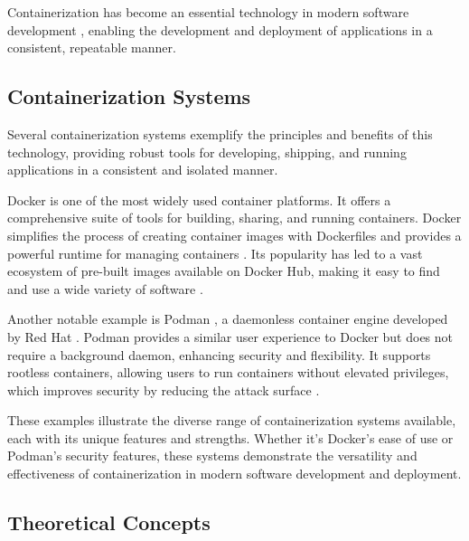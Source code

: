 Containerization has become an essential technology in modern software development
\cite[Docker: a Little Background]{merkelDockerLightweightLinux2014}, enabling the
development and deployment of applications in a consistent, repeatable manner.

\subsection{Containerization Systems}

Several containerization systems exemplify the principles and benefits of this
technology, providing robust tools for developing, shipping, and running applications
in a consistent and isolated manner.

Docker \cite{DockerHomepage2022} is one of the most widely used container platforms.
It offers a comprehensive suite of tools for building, sharing, and running containers.
Docker simplifies the process of creating container images with Dockerfiles and
provides a powerful runtime for managing containers \cite{DockerfileReference0200}.
Its popularity has led to a vast ecosystem of pre-built images available on Docker
Hub, making it easy to find and use a wide variety of software \cite{DockerHubContainer}.

Another notable example is Podman \cite{Podman2024}, a daemonless container engine
developed by Red Hat \cite{RedHatWe}. Podman provides a similar user experience to
Docker but does not require a background daemon, enhancing security and flexibility.
It supports rootless containers, allowing users to run containers without elevated
privileges, which improves security by reducing the attack surface \cite[4.1]
{priedhorskyMinimizingPrivilegeBuilding2021}.

These examples illustrate the diverse range of containerization systems available,
each with its unique features and strengths. Whether it's Docker's ease of use or
Podman's security features, these systems demonstrate the versatility and effectiveness
of containerization in modern software development and deployment.

\subsection{Theoretical Concepts}


